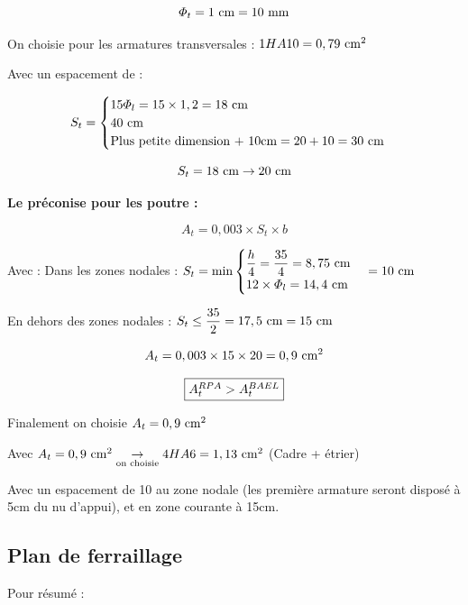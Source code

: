 \[ \varPhi_{t} = 1\cml = 10\mm \]

On choisie pour les armatures transversales : $1HA10 = 0,79\cmsq$

Avec un espacement de :

\[ S_{t} = \begin{cases}
	15\varPhi_{l} = 15 \times 1,2 = 18\cml \\
	40\cml \\
	\text{Plus petite dimension  + 10cm} = 20 + 10 = 30\cml
\end{cases} \]

\[ S_{t} = 18\cml \rightarrow 20\cml \]

\vspace{2\baselineskip}

\textbf{Le \cite[7.5.2.2]{rpa} préconise pour les poutre :}

\[ A_{t} = 0,003 \times S_{t} \times b \]

Avec : Dans les zones nodales : $S_{t} = \min \begin{cases}
	\dfrac{h}{4} = \dfrac{35}{4} = 8,75\cml \\
	12 \times \varPhi_{l} = 14,4\cml
\end{cases} = 10\cml$

En dehors des zones nodales : $S_{t} \leq \dfrac{35}{2} = 17,5\cml = 15\cml$

\[ A_{t} = 0,003 \times 15 \times 20 = 0,9\cmsq \]

\[ \fbox{$A_{t}^{RPA} > A_{t}^{BAEL}$} \]
{\centering Finalement on choisie $A_{t} = 0,9\cmsq$\par}

\vspace{\baselineskip}

Avec $A_{t} = 0,9\cmsq \underset{\text{on choisie}}{\rightarrow} 4HA6 = 1,13\cmsq$ (Cadre + étrier)

\vspace{\baselineskip}

Avec un espacement de 10 au zone nodale (les première armature seront disposé à 5cm du nu d'appui), et en zone courante à 15cm.




\subsection{Plan de ferraillage}

Pour résumé :

